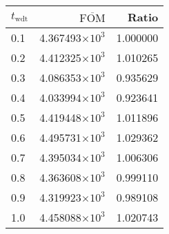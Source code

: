 \begin{tabular}{lrr}
\toprule
$t_{\mathrm{wdt}}$ & $\overline{\mathrm{FOM}}$ &    Ratio \\
\midrule
               0.1 &   4.367493$\times 10^{3}$ & 1.000000 \\
               0.2 &   4.412325$\times 10^{3}$ & 1.010265 \\
               0.3 &   4.086353$\times 10^{3}$ & 0.935629 \\
               0.4 &   4.033994$\times 10^{3}$ & 0.923641 \\
               0.5 &   4.419448$\times 10^{3}$ & 1.011896 \\
               0.6 &   4.495731$\times 10^{3}$ & 1.029362 \\
               0.7 &   4.395034$\times 10^{3}$ & 1.006306 \\
               0.8 &   4.363608$\times 10^{3}$ & 0.999110 \\
               0.9 &   4.319923$\times 10^{3}$ & 0.989108 \\
               1.0 &   4.458088$\times 10^{3}$ & 1.020743 \\
\bottomrule
\end{tabular}
